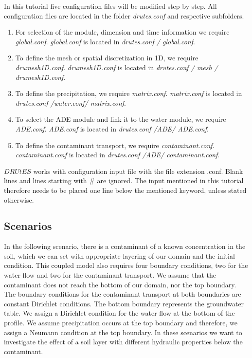 In this tutorial five configuration files will be modified step by step. All configuration files are located in the folder \emph{drutes.conf} and respective subfolders. \begin{enumerate}
\item For selection of the module, dimension and time information we require \emph{global.conf}.  \emph{global.conf} is located in \emph{drutes.conf / global.conf}. 
\item To define the mesh or spatial discretization in 1D,  we require \emph{drumesh1D.conf}. \emph{drumesh1D.conf} is located in \emph{drutes.conf / mesh / drumesh1D.conf}. 
\item To define the precipitation, we require \emph{matrix.conf}. \emph{matrix.conf} is located in \emph{drutes.conf /water.conf/ matrix.conf}. 
\item To select the ADE module and link it to the water module, we require \emph{ADE.conf}. \emph{ADE.conf} is located in \emph{drutes.conf /ADE/ ADE.conf}. 
\item To define the contaminant transport, we require \emph{contaminant.conf}. \emph{contaminant.conf} is located in \emph{drutes.conf /ADE/ contaminant.conf}. 
\end{enumerate}
$DRUtES$ works with configuration input file with the file extension .conf. Blank lines and lines starting with \# are ignored. The input mentioned in this tutorial therefore needs to be placed one line below the mentioned keyword, unless stated otherwise. 

\newpage
\subsection{Scenarios}

In the following scenario, there is a contaminant of a known concentration in the soil, which we can set with appropriate layering of our domain and the initial condition. This coupled model also requires four boundary conditions, two for the water flow and two for the contaminant transport. We assume that the contaminant does not reach the bottom of our domain, nor the top boundary. The boundary conditions for the contaminant transport at both boundaries are constant Dirichlet conditions. The bottom boundary represents the groundwater table. We assign a Dirichlet condition for the water flow at the bottom of the profile. We assume precipitation occurs at the top boundary and therefore, we assign a Neumann condition at the top boundary. In these scenarios we want to investigate the effect of a soil layer with different hydraulic properties below the contaminant.  

